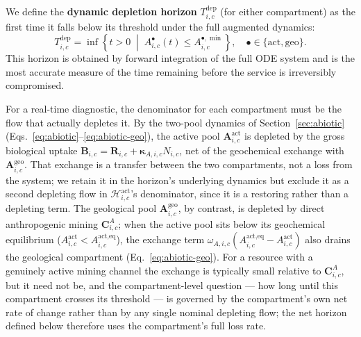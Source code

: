 \documentclass[twocolumn,10pt]{article}
\begin{document}
We define the \textbf{dynamic depletion horizon} $T^{\text{dep}}_{i,c}$ (for either compartment) as the first time it falls below its threshold under the full augmented dynamics:
\begin{equation}
T^{\text{dep}}_{i,c} = \inf\left\{ t > 0 \;\middle|\; A^{\bullet}_{i,c}(t) \le A^{\bullet,\min}_{i,c} \right\}, \quad \bullet\in\{\text{act},\text{geo}\}. \label{eq:dynamic-horizon}
\end{equation}
This horizon is obtained by forward integration of the full ODE system and is the most accurate measure of the time remaining before the service is irreversibly compromised.

For a real-time diagnostic, the denominator for each compartment must be the flow that actually depletes it. By the two-pool dynamics of Section~\ref{sec:abiotic} (Eqs.~\eqref{eq:abiotic}--\eqref{eq:abiotic-geo}), the active pool $\mathbf A^{\text{act}}_{i,c}$ is depleted by the gross biological uptake $\mathbf B_{i,c}=\mathbf R_{i,c}+\boldsymbol\kappa_{A,i,c}N_{i,c}$, net of the geochemical exchange with $\mathbf A^{\text{geo}}_{i,c}$. That exchange is a transfer between the two compartments, not a loss from the system; we retain it in the horizon's underlying dynamics but exclude it as a second depleting flow in $\mathcal H^{\text{act}}_{i,c}$'s denominator, since it is a restoring rather than a depleting term. The geological pool $\mathbf A^{\text{geo}}_{i,c}$, by contrast, is depleted by direct anthropogenic mining $\mathbf C^A_{i,c}$; when the active pool sits below its geochemical equilibrium ($A^{\text{act}}_{i,c}<A^{\text{act,eq}}_{i,c}$), the exchange term $\omega_{A,i,c}(A^{\text{act,eq}}_{i,c}-A^{\text{act}}_{i,c})$ also drains the geological compartment (Eq.~\eqref{eq:abiotic-geo}). For a resource with a genuinely active mining channel the exchange is typically small relative to $\mathbf C^A_{i,c}$, but it need not be, and the compartment-level question --- how long until this compartment crosses its threshold --- is governed by the compartment's own net rate of change rather than by any single nominal depleting flow; the net horizon defined below therefore uses the compartment's full loss rate.
\end{document}

